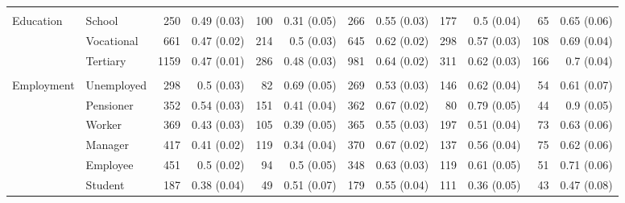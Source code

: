 \begin{tabular}{p{1.2in}p{1.2in}rrrrrrrrrr}
	\vspace{1pt}\\
Education & School & 250 & 0.49 (0.03) & 100 & 0.31 (0.05) & 266 & 0.55 (0.03) & 177 & 0.5 (0.04) & 65 & 0.65 (0.06) \\ 
 & Vocational & 661 & 0.47 (0.02) & 214 & 0.5 (0.03) & 645 & 0.62 (0.02) & 298 & 0.57 (0.03) & 108 & 0.69 (0.04) \\ 
 & Tertiary & 1159 & 0.47 (0.01) & 286 & 0.48 (0.03) & 981 & 0.64 (0.02) & 311 & 0.62 (0.03) & 166 & 0.7 (0.04) \\ 
	\vspace{1pt}\\
Employment & Unemployed & 298 & 0.5 (0.03) & 82 & 0.69 (0.05) & 269 & 0.53 (0.03) & 146 & 0.62 (0.04) & 54 & 0.61 (0.07) \\ 
 & Pensioner & 352 & 0.54 (0.03) & 151 & 0.41 (0.04) & 362 & 0.67 (0.02) & 80 & 0.79 (0.05) & 44 & 0.9 (0.05) \\ 
 & Worker & 369 & 0.43 (0.03) & 105 & 0.39 (0.05) & 365 & 0.55 (0.03) & 197 & 0.51 (0.04) & 73 & 0.63 (0.06) \\ 
 & Manager & 417 & 0.41 (0.02) & 119 & 0.34 (0.04) & 370 & 0.67 (0.02) & 137 & 0.56 (0.04) & 75 & 0.62 (0.06) \\ 
 & Employee & 451 & 0.5 (0.02) & 94 & 0.5 (0.05) & 348 & 0.63 (0.03) & 119 & 0.61 (0.05) & 51 & 0.71 (0.06) \\ 
 & Student & 187 & 0.38 (0.04) & 49 & 0.51 (0.07) & 179 & 0.55 (0.04) & 111 & 0.36 (0.05) & 43 & 0.47 (0.08) \\ 



\end{tabular}
